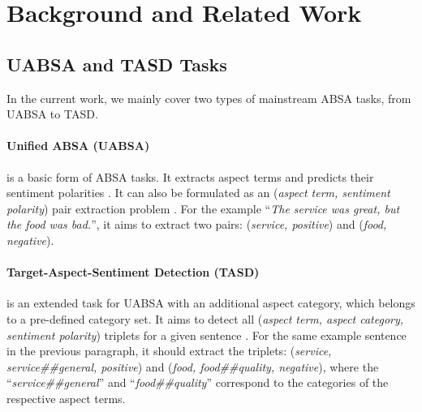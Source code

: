 \section{Background and Related Work}
\subsection{UABSA and TASD Tasks}
In the current work, we mainly cover two types of mainstream ABSA tasks, from UABSA to TASD. 

\paragraph{Unified ABSA (UABSA)} is a basic form of ABSA tasks. It extracts aspect terms and predicts their sentiment polarities \cite{li2019unified, Chen_Qian_2020, zhang-etal-2021-towards-generative}. It can also be formulated as an (\textit{aspect term, sentiment polarity}) pair extraction problem \cite{zhang-etal-2021-towards-generative}. For the example ``\textit{The service was great, but the food was bad.}'', it aims to extract two pairs: (\textit{service, positive}) and (\textit{food, negative}). 

\paragraph{Target-Aspect-Sentiment Detection (TASD)} is an extended task for UABSA with an additional aspect category, which belongs to a pre-defined category set. It aims to detect all (\textit{aspect term, aspect category, sentiment polarity}) triplets for a given sentence \cite{wan2020target, zhang-etal-2021-towards-generative}. For the same example sentence in the previous paragraph, it should extract the triplets: (\textit{service, service\#\#general, positive}) and (\textit{food, food\#\#quality, negative}), where the ``\textit{service\#\#general}'' and ``\textit{food\#\#quality}'' correspond to the categories of the respective aspect terms. 



